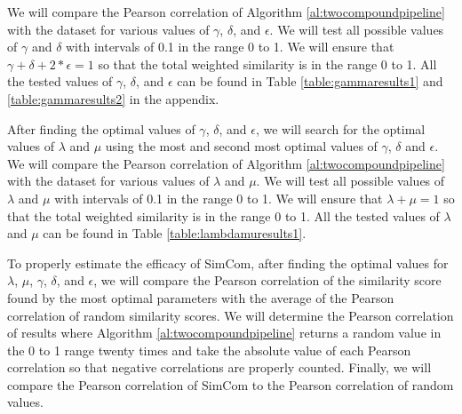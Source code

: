 \documentclass{article}
\begin{document}
We will compare the Pearson correlation of Algorithm \ref{al:twocompoundpipeline} with the dataset for various values of $\gamma$, $\delta$, and $\epsilon$. We will test all possible values of $\gamma$ and $\delta$ with intervals of 0.1 in the range 0 to 1. We will ensure that $\gamma + \delta + 2 * \epsilon = 1$ so that the total weighted similarity is in the range 0 to 1. All the tested values of $\gamma$, $\delta$, and $\epsilon$ can be found in Table \ref{table:gammaresults1} and \ref{table:gammaresults2} in the appendix. 

After finding the optimal values of $\gamma$, $\delta$, and $\epsilon$, we will search for the optimal values of $\lambda$ and $\mu$ using the most and second most optimal values of $\gamma$, $\delta$ and $\epsilon$. We will compare the Pearson correlation of Algorithm \ref{al:twocompoundpipeline} with the dataset for various values of $\lambda$ and $\mu$. We will test all possible values of $\lambda$ and $\mu$ with intervals of 0.1 in the range 0 to 1. We will ensure that $\lambda + \mu = 1$ so that the total weighted similarity is in the range 0 to 1. All the tested values of $\lambda$ and $\mu$ can be found in Table \ref{table:lambdamuresults1}.

To properly estimate the efficacy of SimCom, after finding the optimal values for $\lambda$, $\mu$, $\gamma$, $\delta$, and $\epsilon$, we will compare the Pearson correlation of the similarity score found by the most optimal parameters with the average of the Pearson correlation of random similarity scores. We will determine the Pearson correlation of results where Algorithm \ref{al:twocompoundpipeline} returns a random value in the 0 to 1 range twenty times and take the absolute value of each Pearson correlation so that negative correlations are properly counted. Finally, we will compare the Pearson correlation of SimCom to the Pearson correlation of random values.



\end{document}
